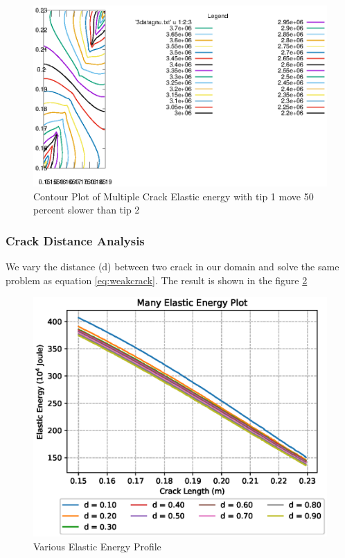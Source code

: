 \documentclass[a4paper,11pt]{article}
\begin{document}
\begin{figure}[h]
	\centering
	\includegraphics[width=0.7\linewidth]{picture/conference/elasticdouble-tip105}
	\caption{Contour Plot of Multiple Crack Elastic energy with tip 1 move 50 percent slower than tip 2}
	\label{fig:elasticdouble-tip105}
\end{figure}
\iffalse
\subsubsection{Crack Distance Analysis}
We vary the distance (d) between two crack in our domain and solve the same problem as equation \ref{eq:weakcrack}. The result is shown in the figure \ref{fig:manyelastic-lvar}
\begin{figure}[h!]
	\centering
	\includegraphics[width=0.8\linewidth]{picture/conference/manyelastic-lvar}
	\caption{Various Elastic Energy Profile}
	\label{fig:manyelastic-lvar}
\end{figure}
\end{document}

